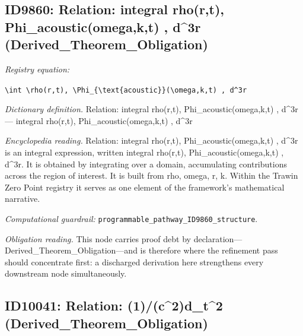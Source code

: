 \documentclass[11pt]{article}
\theoremstyle{remark}
\begin{document}
\subsection{ID9860: Relation: integral rho(r,t), Phi\_acoustic(omega,k,t) , d\textasciicircum{}3r (Derived\_Theorem\_Obligation)}

\noindent\textit{Registry equation:}\par
{\small\texttt{\textbackslash{}int \textbackslash{}rho(r,t), \textbackslash{}Phi\_\{\textbackslash{}text\{acoustic\}\}(\textbackslash{}omega,k,t) , d\textasciicircum{}3r}}\par\medskip
\noindent\textit{Dictionary definition.} Relation: integral rho(r,t), Phi\_acoustic(omega,k,t) , d\textasciicircum{}3r --- integral rho(r,t), Phi\_acoustic(omega,k,t) , d\textasciicircum{}3r\par\medskip
\noindent\textit{Encyclopedia reading.} Relation: integral rho(r,t), Phi\_acoustic(omega,k,t) , d\textasciicircum{}3r is an integral expression, written integral rho(r,t), Phi\_acoustic(omega,k,t) , d\textasciicircum{}3r. It is obtained by integrating over a domain, accumulating contributions across the region of interest. It is built from rho, omega, r, k. Within the Trawin Zero Point registry it serves as one element of the framework's mathematical narrative.
\par\medskip\noindent\textit{Computational guardrail:} \texttt{programmable\_pathway\_ID9860\_structure}.
\par\medskip\noindent\textit{Obligation reading.} This node carries proof debt by declaration---Derived\_Theorem\_Obligation---and is therefore where the refinement pass should concentrate first: a discharged derivation here strengthens every downstream node simultaneously.

\subsection{ID10041: Relation: (1)/(c\textasciicircum{}2)d\_t\textasciicircum{}2 (Derived\_Theorem\_Obligation)}
\end{document}
